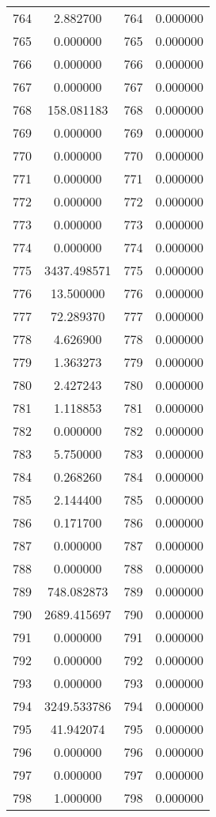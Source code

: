 \documentclass[12pt]{article}
\begin{document}
\begin{longtable}{@{}cccc@{}}
764 & 2.882700 & 764 & 0.000000 \\
765 & 0.000000 & 765 & 0.000000 \\
766 & 0.000000 & 766 & 0.000000 \\
767 & 0.000000 & 767 & 0.000000 \\
768 & 158.081183 & 768 & 0.000000 \\
769 & 0.000000 & 769 & 0.000000 \\
770 & 0.000000 & 770 & 0.000000 \\
771 & 0.000000 & 771 & 0.000000 \\
772 & 0.000000 & 772 & 0.000000 \\
773 & 0.000000 & 773 & 0.000000 \\
774 & 0.000000 & 774 & 0.000000 \\
775 & 3437.498571 & 775 & 0.000000 \\
776 & 13.500000 & 776 & 0.000000 \\
777 & 72.289370 & 777 & 0.000000 \\
778 & 4.626900 & 778 & 0.000000 \\
779 & 1.363273 & 779 & 0.000000 \\
780 & 2.427243 & 780 & 0.000000 \\
781 & 1.118853 & 781 & 0.000000 \\
782 & 0.000000 & 782 & 0.000000 \\
783 & 5.750000 & 783 & 0.000000 \\
784 & 0.268260 & 784 & 0.000000 \\
785 & 2.144400 & 785 & 0.000000 \\
786 & 0.171700 & 786 & 0.000000 \\
787 & 0.000000 & 787 & 0.000000 \\
788 & 0.000000 & 788 & 0.000000 \\
789 & 748.082873 & 789 & 0.000000 \\
790 & 2689.415697 & 790 & 0.000000 \\
791 & 0.000000 & 791 & 0.000000 \\
792 & 0.000000 & 792 & 0.000000 \\
793 & 0.000000 & 793 & 0.000000 \\
794 & 3249.533786 & 794 & 0.000000 \\
795 & 41.942074 & 795 & 0.000000 \\
796 & 0.000000 & 796 & 0.000000 \\
797 & 0.000000 & 797 & 0.000000 \\
798 & 1.000000 & 798 & 0.000000 \\

\end{longtable}
\end{document}
